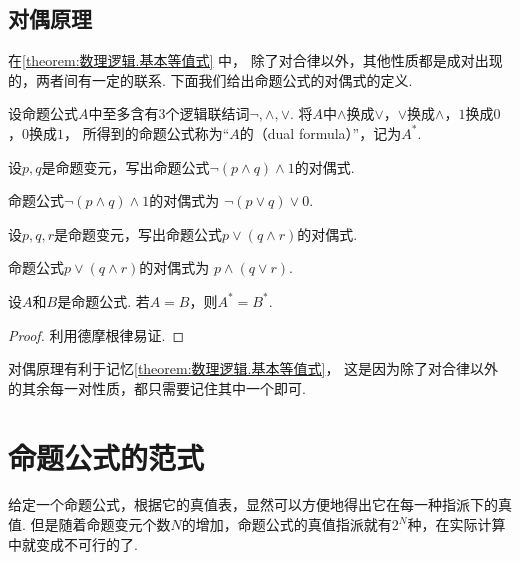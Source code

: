 \subsection{对偶原理}
在\cref{theorem:数理逻辑.基本等值式} 中，
除了对合律以外，其他性质都是成对出现的，两者间有一定的联系.
下面我们给出命题公式的对偶式的定义.
\begin{definition}
设命题公式\(A\)中至多含有3个逻辑联结词\(\neg,\land,\lor\).
将\(A\)中\(\land\)换成\(\lor\)，\(\lor\)换成\(\land\)，\(1\)换成\(0\)，\(0\)换成\(1\)，
所得到的命题公式称为“\(A\)的（dual formula）”，记为\(A^*\).
\end{definition}

\begin{example}
设\(p,q\)是命题变元，写出命题公式\(\neg(p \land q) \land 1\)的对偶式.
\begin{solution}
命题公式\(\neg(p \land q) \land 1\)的对偶式为
\(\neg(p \lor q) \lor 0\).
\end{solution}
\end{example}

\begin{example}
设\(p,q,r\)是命题变元，写出命题公式\(p \lor (q \land r)\)的对偶式.
\begin{solution}
命题公式\(p \lor (q \land r)\)的对偶式为
\(p \land (q \lor r)\).
\end{solution}
\end{example}

\begin{theorem}[对偶原理]
设\(A\)和\(B\)是命题公式.
若\(A = B\)，则\(A^* = B^*\).
\begin{proof}
利用德摩根律易证.
\end{proof}
\end{theorem}

对偶原理有利于记忆\cref{theorem:数理逻辑.基本等值式}，
这是因为除了对合律以外的其余每一对性质，都只需要记住其中一个即可.

\section{命题公式的范式}
给定一个命题公式，根据它的真值表，显然可以方便地得出它在每一种指派下的真值.
但是随着命题变元个数\(N\)的增加，命题公式的真值指派就有\(2^N\)种，在实际计算中就变成不可行的了.

